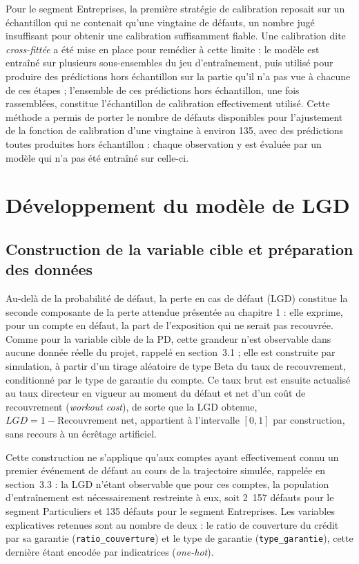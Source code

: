 Pour le segment Entreprises, la première stratégie de calibration reposait sur un échantillon qui ne contenait qu'une vingtaine de défauts, un nombre jugé insuffisant pour obtenir une calibration suffisamment fiable. Une calibration dite \emph{cross-fittée} a été mise en place pour remédier à cette limite : le modèle est entraîné sur plusieurs sous-ensembles du jeu d'entraînement, puis utilisé pour produire des prédictions hors échantillon sur la partie qu'il n'a pas vue à chacune de ces étapes ; l'ensemble de ces prédictions hors échantillon, une fois rassemblées, constitue l'échantillon de calibration effectivement utilisé. Cette méthode a permis de porter le nombre de défauts disponibles pour l'ajustement de la fonction de calibration d'une vingtaine à environ 135, avec des prédictions toutes produites hors échantillon : chaque observation y est évaluée par un modèle qui n'a pas été entraîné sur celle-ci.

\section{Développement du modèle de LGD}

\subsection{Construction de la variable cible et préparation des données}

Au-delà de la probabilité de défaut, la perte en cas de défaut (LGD) constitue la seconde composante de la perte attendue présentée au chapitre 1 : elle exprime, pour un compte en défaut, la part de l'exposition qui ne serait pas recouvrée. Comme pour la variable cible de la PD, cette grandeur n'est observable dans aucune donnée réelle du projet, rappelé en section~3.1 ; elle est construite par simulation, à partir d'un tirage aléatoire de type Beta du taux de recouvrement, conditionné par le type de garantie du compte. Ce taux brut est ensuite actualisé au taux directeur en vigueur au moment du défaut et net d'un coût de recouvrement (\emph{workout cost}), de sorte que la LGD obtenue, $LGD = 1 - \text{Recouvrement net}$, appartient à l'intervalle $[0,1]$ par construction, sans recours à un écrêtage artificiel.

Cette construction ne s'applique qu'aux comptes ayant effectivement connu un premier événement de défaut au cours de la trajectoire simulée, rappelée en section~3.3 : la LGD n'étant observable que pour ces comptes, la population d'entraînement est nécessairement restreinte à eux, soit 2~157 défauts pour le segment Particuliers et 135 défauts pour le segment Entreprises. Les variables explicatives retenues sont au nombre de deux : le ratio de couverture du crédit par sa garantie (\texttt{ratio\_couverture}) et le type de garantie (\texttt{type\_garantie}), cette dernière étant encodée par indicatrices (\emph{one-hot}).

